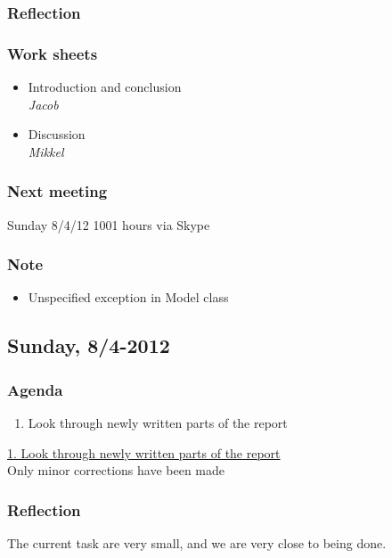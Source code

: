 \documentclass[a4paper,11pt]{article}
\begin{document}
\subsubsection*{Reflection}


\subsubsection*{Work sheets}
\begin{itemize}
	\item Introduction and conclusion \\
		\textsl{Jacob}
	\item Discussion \\
		\textsl{Mikkel}
\end{itemize}

\subsubsection*{Next meeting}
Sunday 8/4/12 1001 hours via Skype

\subsubsection*{Note}
\begin{itemize}
	\item Unspecified exception in Model class
\end{itemize}


\pagebreak
\subsection{Sunday, 8/4-2012}

\subsubsection*{Agenda}
\begin{enumerate}
	\item Look through newly written parts of the report
\end{enumerate}
\underline{1. Look through newly written parts of the report} \\
Only minor corrections have been made

\subsubsection*{Reflection}
The current task are very small, and we are very close to being done.
\end{document}
